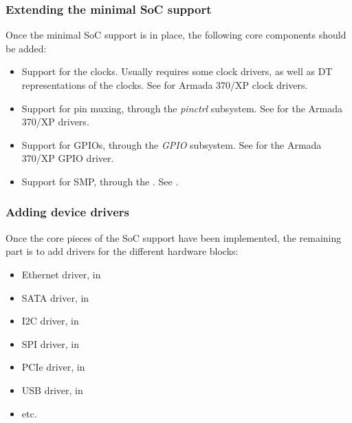 \begin{frame}
  \frametitle{Extending the minimal SoC support}

  Once the minimal SoC support is in place, the following core
  components should be added:
  \begin{itemize}
  \item Support for the clocks. Usually requires some clock drivers,
    as well as DT representations of the clocks. See
     for Armada 370/XP clock drivers.
  \item Support for pin muxing, through the {\em pinctrl}
    subsystem. See  for the Armada 370/XP
    drivers.
  \item Support for GPIOs, through the {\em GPIO} subsystem. See
     for the Armada 370/XP GPIO
    driver.
  \item Support for SMP, through the . See
    .
  \end{itemize}
\end{frame}

\begin{frame}
  \frametitle{Adding device drivers}
  Once the core pieces of the SoC support have been implemented, the
  remaining part is to add drivers for the different hardware blocks:
  \begin{itemize}
  \item Ethernet driver, in 
  \item SATA driver, in 
  \item I2C driver, in 
  \item SPI driver, in 
  \item PCIe driver, in 
  \item USB driver, in 
  \item etc.
  \end{itemize}
\end{frame}